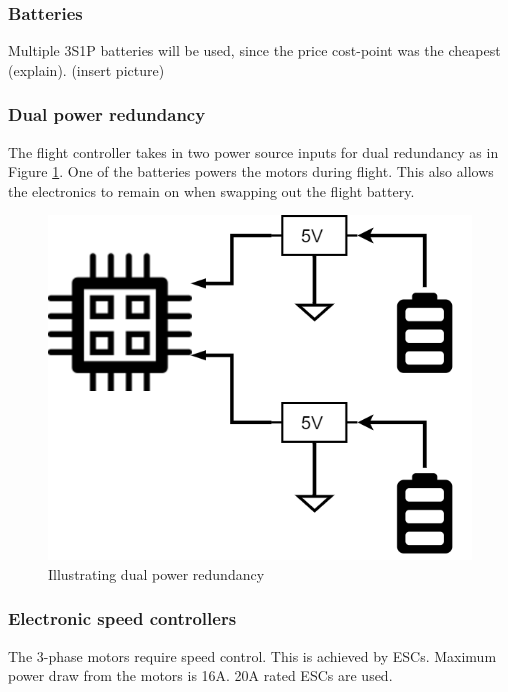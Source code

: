 \subsubsection{Batteries}

Multiple 3S1P batteries will be used, since the price cost-point was the cheapest (explain). (insert picture)

\subsubsection{Dual power redundancy}

The flight controller takes in two power source inputs for dual redundancy as in Figure \ref{fig:dual_redundancy}. One of the batteries powers the motors during flight. This also allows the electronics to remain on when swapping out the flight battery.

\begin{figure}[H]
\centering
\includegraphics[scale=0.35]{images/dual_redundancy.png}
\caption{Illustrating dual power redundancy}
\label{fig:dual_redundancy}
\end{figure}

\subsubsection{Electronic speed controllers}

The 3-phase motors require speed control. This is achieved by ESCs. Maximum power draw from the motors is 16A. 20A rated ESCs are used.

